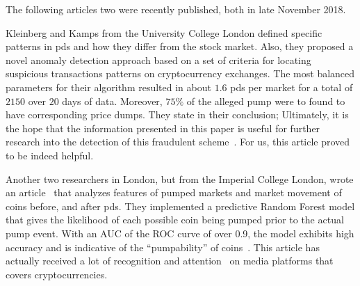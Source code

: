 The following articles two were recently published, both in late November 2018.

Kleinberg and Kamps from the University College London\cite{P&D_to_the_moon} defined specific patterns in \acp{pd} and how they differ from the stock market. Also, they proposed a novel anomaly detection approach based on a set of criteria for locating suspicious transactions patterns on cryptocurrency exchanges. The most balanced parameters for their algorithm resulted in about $1.6$ \acp{pd} per market for a total of $2150$ over $20$ days of data. Moreover, $75\%$ of the alleged pump were to found to have corresponding price dumps. They state in their conclusion; Ultimately, it is the hope that the information presented in this paper is useful for further research into the detection of this fraudulent scheme~\cite{P&D_to_the_moon}. For us, this article proved to be indeed helpful.

Another two researchers in London, but from the Imperial College London, wrote an article~\cite{P&D_anatomy} that analyzes features of pumped markets and market movement of coins before, and after \acp{pd}. They implemented a predictive Random Forest model that gives the likelihood of each possible coin being pumped prior to the actual pump event. With an AUC of the ROC curve of over 0.9, the model exhibits high accuracy and is indicative of the “pumpability” of coins~\cite{P&D_anatomy}. This article has actually received a lot of recognition and attention~\cite{P&D_MIT_crypto, P&D_cointelegraph, P&D_UTB} on media platforms that covers cryptocurrencies.
